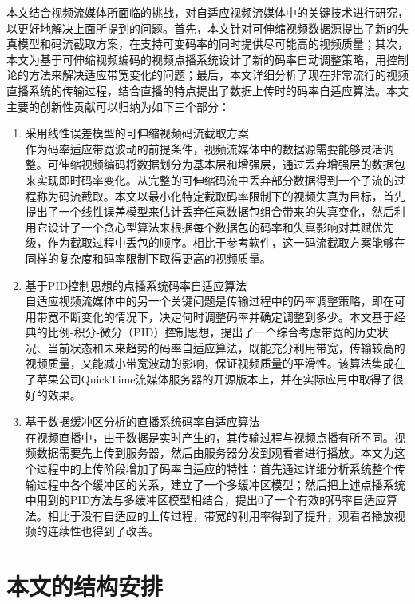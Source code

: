 本文结合视频流媒体所面临的挑战，对自适应视频流媒体中的关键技术进行研究，以更好地解决上面所提到的问题。首先，本文针对可伸缩视频数据源提出了新的失真模型和码流截取方案，在支持可变码率的同时提供尽可能高的视频质量；其次，本文为基于可伸缩视频编码的视频点播系统设计了新的码率自动调整策略，用控制论的方法来解决适应带宽变化的问题；最后，本文详细分析了现在非常流行的视频直播系统的传输过程，结合直播的特点提出了数据上传时的码率自适应算法。本文主要的创新性贡献可以归纳为如下三个部分：
\begin{enumerate}
\item {采用线性误差模型的可伸缩视频码流截取方案}\\
作为码率适应带宽波动的前提条件，视频流媒体中的数据源需要能够灵活调整。可伸缩视频编码将数据划分为基本层和增强层，通过丢弃增强层的数据包来实现即时码率变化。从完整的可伸缩码流中丢弃部分数据得到一个子流的过程称为码流截取。本文以最小化特定截取码率限制下的视频失真为目标，首先提出了一个线性误差模型来估计丢弃任意数据包组合带来的失真变化，然后利用它设计了一个贪心型算法来根据每个数据包的码率和失真影响对其赋优先级，作为截取过程中丢包的顺序。相比于参考软件，这一码流截取方案能够在同样的复杂度和码率限制下取得更高的视频质量。
\item {基于PID控制思想的点播系统码率自适应算法}\\
自适应视频流媒体中的另一个关键问题是传输过程中的码率调整策略，即在可用带宽不断变化的情况下，决定何时调整码率并确定调整到多少。本文基于经典的比例-积分-微分（PID）控制思想，提出了一个综合考虑带宽的历史状况、当前状态和未来趋势的码率自适应算法，既能充分利用带宽，传输较高的视频质量，又能减小带宽波动的影响，保证视频质量的平滑性。该算法集成在了苹果公司QuickTime流媒体服务器的开源版本上，并在实际应用中取得了很好的效果。
\item {基于数据缓冲区分析的直播系统码率自适应算法}\\
在视频直播中，由于数据是实时产生的，其传输过程与视频点播有所不同。视频数据需要先上传到服务器，然后由服务器分发到观看者进行播放。本文为这个过程中的上传阶段增加了码率自适应的特性：首先通过详细分析系统整个传输过程中各个缓冲区的关系，建立了一个多缓冲区模型；然后把上述点播系统中用到的PID方法与多缓冲区模型相结合，提出0了一个有效的码率自适应算法。相比于没有自适应的上传过程，带宽的利用率得到了提升，观看者播放视频的连续性也得到了改善。
\end{enumerate}

\section{本文的结构安排}

